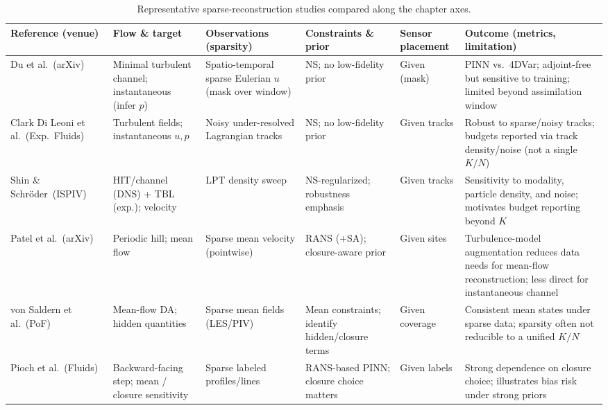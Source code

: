 \documentclass[master]{NTHUthesis}
\begin{document}
\begin{CJK*}{UTF8}{bsmi}
\begin{table}[!htbp]
	    \centering
	    \caption{Representative sparse-reconstruction studies compared along the chapter axes.}
	    \label{tab:reconstruction_methods}
	    \footnotesize
        \setlength{\tabcolsep}{3pt}
        \renewcommand{\arraystretch}{1.15}
	    \begin{tabularx}{\textwidth}{
	        >{\raggedright\arraybackslash}p{2.4cm}
            >{\raggedright\arraybackslash}p{2.2cm}
            >{\raggedright\arraybackslash}p{2.3cm}
            >{\raggedright\arraybackslash}p{2.1cm}
            >{\raggedright\arraybackslash}p{1.8cm}
            X
	    }
	    \toprule
		    \textbf{Reference (venue)} & \textbf{Flow \& target} & \textbf{Observations (sparsity)} & \textbf{Constraints \& prior} & \textbf{Sensor placement} & \textbf{Outcome (metrics, limitation)} \\
	    \midrule
		    Du et al.\ (arXiv)~\cite{du2022stateestimationminimalturbulent} & Minimal turbulent channel; instantaneous (infer $p$) & Spatio-temporal sparse Eulerian $u$ (mask over window) & NS; no low-fidelity prior & Given (mask) & PINN vs.\ 4DVar; adjoint-free but sensitive to training; limited beyond assimilation window \\
		    Clark Di Leoni et al.\ (Exp.\ Fluids)~\cite{Clark_Di_Leoni_2023} & Turbulent fields; instantaneous $u,p$ & Noisy under-resolved Lagrangian tracks & NS; no low-fidelity prior & Given tracks & Robust to sparse/noisy tracks; budgets reported via track density/noise (not a single $K/N$) \\
		    Shin \& Schr{\"o}der\ (ISPIV)~\cite{shin2025robust} & HIT/channel (DNS) + TBL (exp.); velocity & LPT density sweep & NS-regularized; robustness emphasis & Given tracks & Sensitivity to modality, particle density, and noise; motivates budget reporting beyond $K$ \\
		    Patel et al.\ (arXiv)~\cite{patel2024turbulencemodelaugmentedphysics} & Periodic hill; mean flow & Sparse mean velocity (pointwise) & RANS (+SA); closure-aware prior & Given sites & Turbulence-model augmentation reduces data needs for mean-flow reconstruction; less direct for instantaneous channel \\
		    von Saldern et al.\ (PoF)~\cite{von_Saldern_2022} & Mean-flow DA; hidden quantities & Sparse mean fields (LES/PIV) & Mean constraints; identify hidden/closure terms & Given coverage & Consistent mean states under sparse data; sparsity often not reducible to a unified $K/N$ \\
		    Pioch et al.\ (Fluids)~\cite{fluids8020043} & Backward-facing step; mean / closure sensitivity & Sparse labeled profiles/lines & RANS-based PINN; closure choice matters & Given labels & Strong dependence on closure choice; illustrates bias risk under strong priors \\

\end{tabularx}
\end{table}
\end{CJK*}
\end{document}
